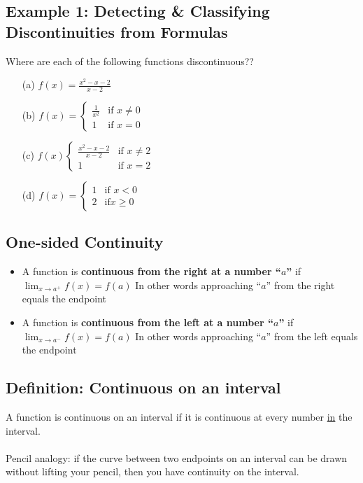 \documentclass[10pt]{book}
\theoremstyle{definition}
\begin{document}
\subsection*{Example 1: Detecting \& Classifying Discontinuities from Formulas}
Where are each of the following functions discontinuous??
\begin{itemize}
    \item[(a)] $\displaystyle f(x)=\frac{x^2-x-2}{x-2}$\vspace{4cm}
    \item[(b)] $\displaystyle f(x) = \begin{cases}
      \displaystyle\frac{1}{x^2} & \text{if }x \neq 0 \\[4pt]
      1 & \text{if }x = 0
    \end{cases}$\vspace{4cm}
    \item[(c)]$f(x)\begin{cases}\displaystyle\frac{x^2-x-2}{x-2} & \text{if } x\neq 2\\[4pt] 1 & \text{if }x=2\end{cases}$\vspace{4cm}
    \item[(d)]$f(x)=\begin{cases}1 & \text{if }x<0\\
    2 & \text{if} x\geq 0\end{cases}$
\end{itemize}
\raggedbottom
\clearpage
\begin{tcolorbox}
\subsection*{One-sided Continuity}
\begin{itemize}
    \item A function is \textbf{continuous from the right at a number ``$a$''} if $\displaystyle\lim_{x\rightarrow a^+}f(x)=f(a)$
    In other words approaching ``$a$'' from the right equals the endpoint
    \item A function is \textbf{continuous from the left at a number ``$a$''} if $\displaystyle\lim_{x\rightarrow a^-}f(x)=f(a)$
    In other words approaching ``$a$'' from the left equals the endpoint
\end{itemize}
\subsection*{Definition: Continuous on an interval}
A function is continuous on an interval if it is continuous at every number \underline{in} the interval. \\ \\
Pencil analogy: if the curve between two endpoints on an interval can be drawn without lifting your pencil, then you have continuity on the interval.
\end{tcolorbox}
\end{document}
